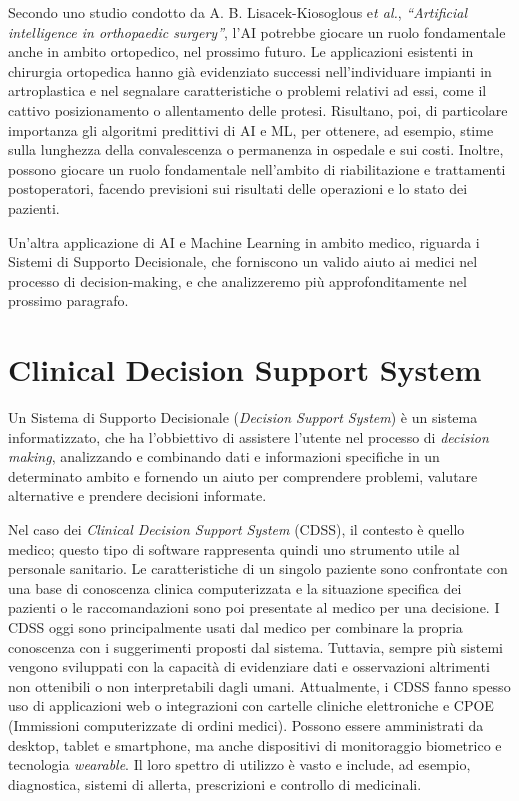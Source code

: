 Secondo uno studio condotto da A. B. Lisacek-Kiosoglous e\textit{t al.}, \textit{“Artificial intelligence in orthopaedic surgery”}\cite{orthopaedic}, l’AI potrebbe giocare un ruolo fondamentale anche in ambito ortopedico, nel prossimo futuro.
\newline
Le applicazioni esistenti in chirurgia ortopedica hanno già evidenziato successi nell’individuare impianti in artroplastica e nel segnalare caratteristiche o problemi relativi ad essi, come il cattivo posizionamento o allentamento delle protesi.
\newline
Risultano, poi, di particolare importanza gli algoritmi predittivi di AI e ML, per ottenere, ad esempio, stime sulla lunghezza della convalescenza o permanenza in ospedale e sui costi. Inoltre, possono giocare un ruolo fondamentale nell'ambito di riabilitazione e trattamenti postoperatori, facendo previsioni sui risultati delle operazioni e lo stato dei pazienti.

Un’altra applicazione di AI e Machine Learning in ambito medico, riguarda i Sistemi di Supporto Decisionale, che forniscono un valido aiuto ai medici nel processo di decision-making, e che analizzeremo più approfonditamente nel prossimo paragrafo.

\section{Clinical Decision Support System}
\label{sec:CDSS}

Un Sistema di Supporto Decisionale (\textit{Decision Support System}) è un sistema informatizzato, che ha l’obbiettivo di assistere l’utente nel processo di \textit{decision making}, analizzando e combinando dati e informazioni specifiche in un determinato ambito e fornendo un aiuto per comprendere problemi, valutare alternative e prendere decisioni informate.

Nel caso dei \textit{Clinical Decision Support System} (CDSS), il contesto è quello medico; questo tipo di software rappresenta quindi uno strumento utile al personale sanitario. 
\newline
Le caratteristiche di un singolo paziente sono confrontate con una base di conoscenza clinica computerizzata e la situazione specifica dei pazienti o le raccomandazioni sono poi presentate al medico per una decisione. 
\newline
I CDSS oggi sono principalmente usati dal medico per combinare la propria conoscenza con i suggerimenti proposti dal sistema. Tuttavia, sempre più sistemi vengono sviluppati con la capacità di evidenziare dati e osservazioni altrimenti non ottenibili o non interpretabili dagli umani.
\newline
Attualmente, i CDSS fanno spesso uso di applicazioni web o integrazioni con cartelle cliniche elettroniche e CPOE (Immissioni computerizzate di ordini medici). Possono essere amministrati da desktop, tablet e smartphone, ma anche dispositivi di monitoraggio biometrico e tecnologia \textit{wearable}.
\newline
Il loro spettro di utilizzo è vasto e include, ad esempio, diagnostica, sistemi di allerta, prescrizioni e controllo di medicinali.

